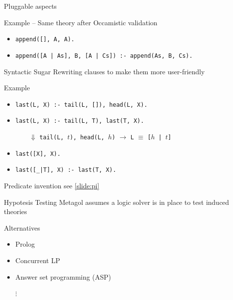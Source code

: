 \documentclass[presentation]{beamer}\mode<presentation>{\usetheme{AMSBolognaFC}}
\begin{document}
\begin{frame}[allowframebreaks]{Pluggable aspects}
    \begin{exampleblock}{Example -- Same theory after Occamistic validation}\scriptsize
        \begin{itemize}
            \item \texttt{append([], A, A).}
            \item \texttt{append([A | As], B, [A | Cs]) :- append(As, B, Cs).}
        \end{itemize}
    \end{exampleblock}

    \framebreak

    \begin{block}{Syntactic Sugar}
        Rewriting clauses to make them more user-friendly
    \end{block}

    \begin{exampleblock}{Example}
        \begin{itemize}
            \item \texttt{last(L, X) :- tail(L, []), head(L, X).}
            \item \texttt{last(L, X) :- tail(L, T), last(T, X).}
            \begin{center}\small
                $\qquad \Downarrow$ {\footnotesize \texttt{tail(L, $t$), head(L, $h$)} $\rightarrow$ \texttt{L} $\equiv$ \texttt{[$h$ | $t$]}}
            \end{center}
            \item \texttt{last([X], X).}
            \item \texttt{last([\_|T], X) :- last(T, X).}
        \end{itemize}
    \end{exampleblock}

    \framebreak

    \begin{block}{Predicate invention}\centering
        see \ref{slide:pi}
    \end{block}

    \framebreak

    \begin{block}{Hypotesis Testing}
        Metagol assumes a logic solver is in place to test induced theories
    \end{block}

    \begin{exampleblock}{Alternatives}
        \begin{itemize}
            \item Prolog
            \item Concurrent LP
            \item Answer set programming (ASP)
            \item[$\vdots$]
        \end{itemize}
    \end{exampleblock}

\end{frame}
\end{document}
